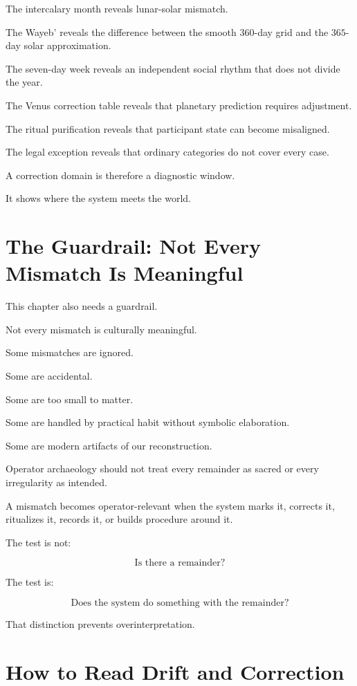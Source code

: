 \documentclass[11pt]{book}
\begin{document}
The intercalary month reveals lunar-solar mismatch.

The Wayeb' reveals the difference between the smooth \(360\)-day grid and the \(365\)-day solar approximation.

The seven-day week reveals an independent social rhythm that does not divide the year.

The Venus correction table reveals that planetary prediction requires adjustment.

The ritual purification reveals that participant state can become misaligned.

The legal exception reveals that ordinary categories do not cover every case.

A correction domain is therefore a diagnostic window.

It shows where the system meets the world.

\section{The Guardrail: Not Every Mismatch Is Meaningful}

This chapter also needs a guardrail.

Not every mismatch is culturally meaningful.

Some mismatches are ignored.

Some are accidental.

Some are too small to matter.

Some are handled by practical habit without symbolic elaboration.

Some are modern artifacts of our reconstruction.

Operator archaeology should not treat every remainder as sacred or every irregularity as intended.

A mismatch becomes operator-relevant when the system marks it, corrects it, ritualizes it, records it, or builds procedure around it.

The test is not:

\[
\text{Is there a remainder?}
\]

The test is:

\[
\text{Does the system do something with the remainder?}
\]

That distinction prevents overinterpretation.

\section{How to Read Drift and Correction}
\end{document}
